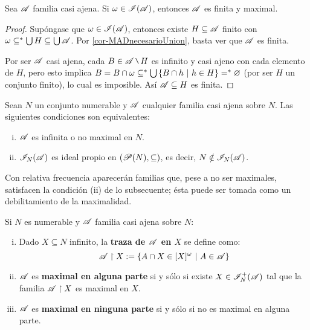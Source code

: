	\begin{proposicion}
		Sea $\mathscr{A}$ familia casi ajena. Si $\omega \in \mathscr{I}(\mathscr{A})$, entonces $\mathscr{A}$ es finita y maximal.
	\end{proposicion}
	 
	\begin{proof}
		Supóngase que $\omega \in \mathscr{I}(\mathscr{A})$, entonces existe $H \subseteq \mathscr{A}$ finito con $\omega \subseteq^* \mbox{$\bigcup$}\, H \subseteq \mbox{$\bigcup$}\, \mathscr{A}$. Por \ref{cor-MADnecesarioUnion}, basta ver que $\mathscr{A}$ es finita.

		Por ser $\mathscr{A}$ casi ajena, cada $B \in \ms{A} \setminus H$ es infinito y casi ajeno con cada elemento de $H$, pero esto implica $ B = B \cap \omega \subseteq^* \mbox{$\bigcup$}\, \{B \cap h \text{ $|$ } h \in H \} =^* \varnothing $ (por ser $H$ un conjunto finito), lo cual es imposible. Así $\mathscr{A} \subseteq H$ es finita.
	\end{proof} 
	
	\begin{corolario}\label{cor-IdealPropioCaract}
		Sean $N$ un conjunto numerable y $\mathscr{A}$ cualquier familia casi ajena sobre $N$. Las siguientes condiciones son equivalentes:
		\begin{enumerate}[i)]
			\item $\mathscr{A}$ es infinita o no maximal en $N$.
			\item $\mathscr{I}_N(\mathscr{A})$ es ideal propio en $(\mathscr{P}(N),\subseteq)$, es decir, $N \notin \mathscr{I}_N(\mathscr{A})$.
		\end{enumerate}
	\end{corolario}
	
	Con relativa frecuencia aparecerán familias que, pese a no ser maximales, satisfacen la condición (ii) de lo subsecuente; ésta puede ser tomada como un debilitamiento de la maximalidad.
	
	\begin{definicion}\label{def-MaxEnAlguna}
		Si $N$ es numerable y $\mathscr{A}$ familia casi ajena sobre $N$:
		\begin{enumerate}[i)]
			\item Dado $X \subseteq N$ infinito, la \textbf{traza de $\mathscr{A}$ en $X$} se define como:
			$$ \mathscr{A} \upharpoonright X := \{ A \cap X \in [X]^\omega \text{ $|$ } A \in \mathscr{A} \} $$
			\item $\mathscr{A}$ es \textbf{maximal en alguna parte} si y sólo si existe $X \in \mathscr{I}_N^+(\mathscr{A})$ tal que la familia $\mathscr{A} \upharpoonright X$ es maximal en $X$.
			\item $\mathscr{A}$ es \textbf{maximal en ninguna parte} si y sólo si no es maximal en alguna parte. 
		\end{enumerate}
	\end{definicion}
	
